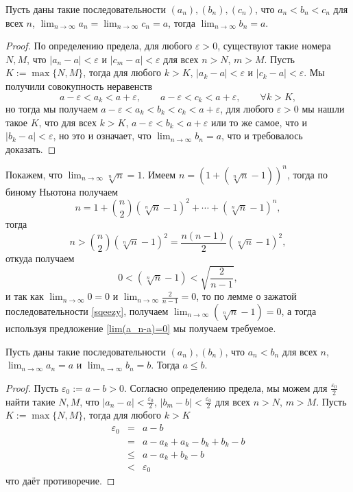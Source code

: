 \begin{lemma}\label{sqeezy}
    Пусть даны такие последовательности $(a_n), (b_n), (c_n)$, что $a_n<b_n<c_n$ для всех $n$, $\lim_{n \to \infty} a_n = \lim_{n \to \infty} c_n = a$, тогда $\lim_{n \to \infty} b_n = a.$
\end{lemma}
\begin{proof}
   По определению предела, для любого $\varepsilon >0$, существуют такие номера $N,M$, что $|a_n - a| < \varepsilon$ и $|c_m - a|< \varepsilon$ для всех $n>N$, $m>M$. Пусть $K:=\max\{N,M\}$, тогда для любого $k>K$, $|a_k - a| < \varepsilon$ и $|c_k - a|< \varepsilon$. Мы получили совокупность неравенств
   \[
   a - \varepsilon < a_k < a+ \varepsilon, \qquad a -\varepsilon < c_k < a+ \varepsilon, \qquad \forall k >K,
   \]
   но тогда мы получаем $a- \varepsilon < a_k < b_k < c_k < a + \varepsilon$, \ie для любого $\varepsilon>0$ мы нашли такое $K$, что для всех $k>K$, $a- \varepsilon < b_k < a+ \varepsilon$ или то же самое, что и $|b_k -a|< \varepsilon$, но это и означает, что $\lim_{n \to \infty}b_n = a$, что и требовалось доказать.
\end{proof}

\begin{example}\label{sqrt[n]{n}->1}
    Покажем, что $\lim_{n\to \infty}\sqrt[n]{n} = 1$. Имеем $n = \left(1+ (\sqrt[n]{n}-1) \right)^n$, тогда по биному Ньютона получаем
    \[
     n = 1 + \binom{n}{2} (\sqrt[n]{n} - 1)^2 + \cdots + (\sqrt[n]{n} - 1)^n,
    \]
    тогда
    \[
     n > \binom{n}{2} (\sqrt[n]{n} - 1)^2 = \frac{n(n-1)}{2} (\sqrt[n]{n} - 1)^2,
    \]
    откуда получаем
    \[
     0 < (\sqrt[n]{n} - 1) < \sqrt{\frac{2}{n-1}} ,
    \]
    и так как $\lim_{n\to \infty} 0 = 0$ и $\lim_{n\to \infty} \frac{2}{n-1} = 0$, то по лемме о зажатой последовательности \ref{sqeezy}, получаем $\lim_{n\to \infty} (\sqrt[n]{n} - 1) = 0$, а тогда используя предложение \ref{lim(a_n-a)=0} мы получаем требуемое.

\end{example}


\begin{lemma}\label{a<b}
 Пусть даны такие последовательности $ (a_n ),  (b_n )$, что $a_n<b_n$ для всех $n$, $\lim_{n \to \infty} a_n =a$ и $\lim_{n \to \infty} b_n = b$. Тогда $a\le b$.
\end{lemma}
\begin{proof}
Пусть $\varepsilon_0:=a-b >0$. Согласно определению предела, мы можем для $\frac{\varepsilon_0}{2}$ найти такие $N,M$, что $|a_n - a|<\frac{\varepsilon_0}{2}$, $|b_m-b|<\frac{\varepsilon_0}{2}$ для всех $n>N$, $m>M$.  Пусть $K:=\max\{N,M\}$, тогда для любого $k>K$
\begin{eqnarray*}
    \varepsilon_0 &=& a-b\\
    &=& a-a_k + a_k - b_k+b_k - b \\
    &\le &a-a_k + b_k-b \\
    &<&\varepsilon_0
\end{eqnarray*}
что даёт противоречие.

\end{proof}

